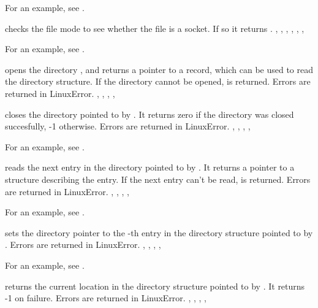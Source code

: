 For an example, see .

{  checks the file mode  to see whether the file is a
socket. If so it returns .
}
{,
 , 
 ,
 ,
 ,
 ,
}


For an example, see .

{  opens the directory  , and returns a 
pointer to a  record, which can be used to read the directory 
structure. If the directory cannot be opened,  is returned.}
{Errors are returned in LinuxError.}
{, , , ,
}



{  closes the directory pointed to by .
It returns zero if the directory was closed succesfully, -1 otherwise.}
{Errors are returned in LinuxError.}
{, , , ,
}

For an example, see .

{ reads the next entry in the directory pointed to by .
It returns a  pointer to a structure describing the entry.
If the next entry can't be read,  is returned.
}
{Errors are returned in LinuxError.}
{, , , ,
}

For an example, see .

{  sets the directory pointer to the -th entry in the
directory structure pointed to by .}
{Errors are returned in LinuxError.}
{, , , ,
}

For an example, see .

{  returns the current location in the directory structure
pointed to by . It returns -1 on failure.}
{Errors are returned in LinuxError.}
{, , , ,
}

